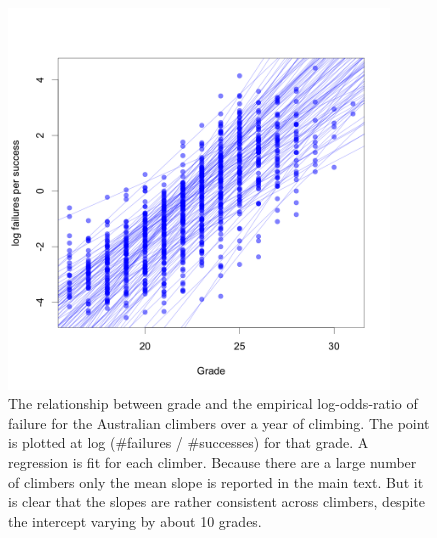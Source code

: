 \documentclass[11pt]{article}
\begin{document}
\begin{figure}
\centering
\includegraphics[width=0.9\textwidth]{figures/aus/ascents-from-2016-08-01-to-2021-08-01-minAscents30-minFails1-Sport-AU-session-regression.png}
\caption{\small The relationship between grade and the empirical log-odds-ratio of failure for the Australian climbers over a year of climbing. The point is plotted at log (\#failures / \#successes) for that grade. A regression is fit for each climber. Because there are a large number of climbers only the mean slope is reported in the main text. But it is clear that the slopes are rather consistent across climbers, despite the intercept varying by about 10 grades.}
\label{fig1}
\end{figure}
\end{document}

